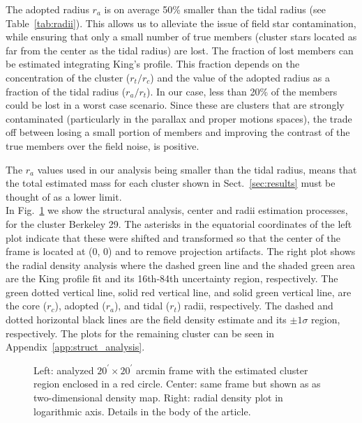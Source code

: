 \documentclass{aa}
\begin{document}
  The adopted radius $r_{a}$ is on average 50\% smaller than the
  tidal radius (see Table~\ref{tab:radii}). This allows us to alleviate the
  issue of field star contamination, while ensuring that only a small number of
  true members (cluster stars located as far from the center as the tidal
  radius) are lost.
  The fraction of lost members can be estimated integrating King's profile. This
  fraction depends on the concentration of the cluster ($r_{t}/r_{c}$) and the
  value of the adopted radius as a fraction of the tidal radius ($r_{a}/r_{t}$).
  In our case, less than 20\% of the members could be lost in a worst case
  scenario. Since these are clusters that are strongly contaminated 
  (particularly in the parallax and proper motions spaces), the trade off
  between losing a small portion of members and improving the contrast of the
  true members over the field noise, is positive.

  The $r_{a}$ values used in our analysis being smaller than the tidal radius,
  means that the total estimated mass for each cluster shown in
  Sect.~\ref{sec:results} must be thought of as a lower limit.\\

  In Fig.~\ref{fig:BER29_struct} we show the structural analysis, center and
  radii estimation processes, for the cluster Berkeley 29. The asterisks in the
  equatorial coordinates of the left plot indicate that these were shifted
  and transformed so that the center of the frame is located at (0, 0) and to
  remove projection artifacts. The right plot shows the radial density analysis
  where the dashed green line and the shaded green area are the King profile fit
  and its 16th-84th uncertainty region, respectively. The green dotted vertical
  line, solid red vertical line, and solid green vertical line, are the core 
  ($r_{c}$), adopted ($r_{a}$), and tidal ($r_{t}$) radii, respectively. The
  dashed and dotted horizontal black lines are the field density estimate and
  its $\pm1\sigma$ region, respectively. The plots for the remaining cluster can
  be seen in Appendix~\ref{app:struct_analysis}.

  \begin{figure}
   \caption{Left: analyzed $20^{\prime} \times 20^{\prime}$ arcmin frame with the
   estimated cluster region enclosed in a red circle. Center: same frame but
   shown as as two-dimensional density map. Right: radial density plot in
   logarithmic axis. Details in the body of the article.}
   \label{fig:BER29_struct}
  \end{figure}
\end{document}
